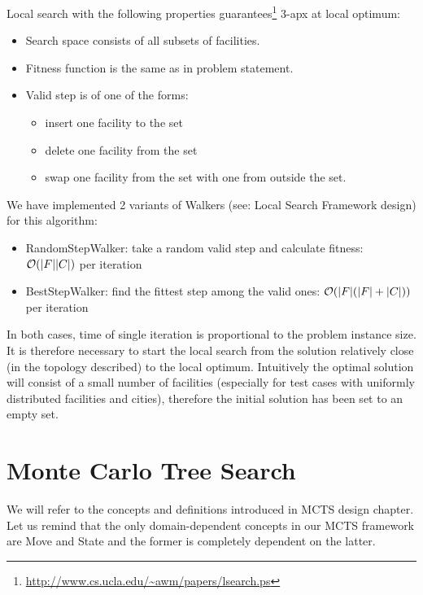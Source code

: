 Local search with the following properties
guarantees\footnote{\url{http://www.cs.ucla.edu/~awm/papers/lsearch.ps}}
3-apx at local optimum:
\begin{itemize}
\item Search space consists of all subsets of facilities.
\item Fitness function is the same as in problem statement.
\item Valid step is of one of the forms:
	\begin{itemize}
	\item insert one facility to the set
	\item delete one facility from the set
	\item swap one facility from the set with one from outside the set.
	\end{itemize}
\end{itemize}

We have implemented 2 variants of Walkers (see: Local Search Framework design)
for this algorithm:
\begin{itemize}
\item RandomStepWalker: take a random valid step and calculate fitness: $\mathcal{O}(|F||C|)$ per iteration
\item BestStepWalker: find the fittest step among the valid ones: $\mathcal{O}(|F|(|F|+|C|))$ per iteration
\end{itemize}

In both cases, time of single iteration is proportional to the problem
instance size. It is therefore necessary to start the local search from
the solution relatively close (in the topology described) to the local
optimum. Intuitively the optimal solution will consist of a small number
of facilities (especially for test cases with uniformly distributed facilities and cities),
therefore the initial solution has been set to an empty set.

\section{Monte Carlo Tree Search}

We will refer to the concepts and definitions introduced in MCTS design
chapter. Let us remind that the only domain-dependent concepts in our MCTS
framework are Move and State and the former is completely dependent on the
latter.

